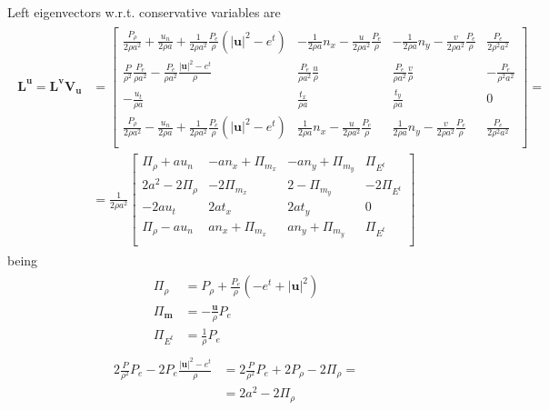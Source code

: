 \documentclass[letterpaper,10pt,english]{jupyterBook}
\begin{document}
\sphinxAtStartPar
Left eigenvectors w.r.t. conservative variables are
\begin{equation*}
\begin{split}\begin{aligned}
\mathbf{L}^\mathbf{u} = \mathbf{L}^{\mathbf{v}} \mathbf{V}_{\mathbf{u}} 
& = 
\begin{bmatrix}
  \frac{P_\rho}{2 \rho a^2} + \frac{u_n}{2 \rho a} + \frac{1}{2 \rho a^2} \frac{P_e}{\rho} (|\mathbf{u}|^2 - e^t) & 
  - \frac{1}{2 \rho a} n_x - \frac{u}{2 \rho a^2}\frac{P_e}{\rho} &
  - \frac{1}{2 \rho a} n_y - \frac{v}{2 \rho a^2}\frac{P_e}{\rho} &
  \frac{P_e}{2 \rho^2 a^2} \\
  \frac{P}{\rho^2}\frac{P_e}{\rho a^2} - \frac{P_e}{\rho a^2} \frac{|\mathbf{u}|^2 - e^t}{\rho} &
    \frac{P_e}{\rho a^2} \frac{u}{\rho} &
    \frac{P_e}{\rho a^2} \frac{v}{\rho} &
  - \frac{P_e}{\rho^2 a^2} \\
  - \frac{u_t}{\rho a} & \frac{t_x}{\rho a} & \frac{t_y}{\rho a} & 0 \\
  \frac{P_\rho}{2 \rho a^2} - \frac{u_n}{2 \rho a} + \frac{1}{2 \rho a^2} \frac{P_e}{\rho} (|\mathbf{u}|^2 - e^t) & 
    \frac{1}{2 \rho a} n_x - \frac{u}{2 \rho a^2}\frac{P_e}{\rho} &
    \frac{1}{2 \rho a} n_y - \frac{v}{2 \rho a^2}\frac{P_e}{\rho} &
  \frac{P_e}{2 \rho^2 a^2} \\
\end{bmatrix} = \\
& =
\frac{1}{2 \rho a^2}
\begin{bmatrix}
  \Pi_\rho + a u_n & - a n_x + \Pi_{m_x}  & - a n_y + \Pi_{m_y} & \Pi_{E^t} \\
   2 a^2 - 2 \Pi_{\rho} & - 2 \Pi_{m_x} & 2 - \Pi_{m_y} & - 2 \Pi_{E^t} \\
  - 2 a u_t & 2 a t_x & 2 a t_y & 0 \\
  \Pi_\rho - a u_n &   a n_x + \Pi_{m_x}  &   a n_y + \Pi_{m_y} & \Pi_{E^t} \\
\end{bmatrix}
\end{aligned}\end{split}
\end{equation*}
\sphinxAtStartPar
being
\begin{equation*}
\begin{split}\begin{aligned}
  \Pi_\rho & = P_\rho + \frac{ P_e }{\rho} \left( - e^t + |\mathbf{u}|^2 \right) \\
  \Pi_{\mathbf{m}} & = -\frac{\mathbf{u}}{\rho} P_e \\
  \Pi_{E^t} & = \frac{1}{\rho} P_e
\end{aligned}\end{split}
\end{equation*}\begin{equation*}
\begin{split}\begin{aligned}
2 \frac{P}{\rho^2} P_e - 2 P_e \frac{|\mathbf{u}|^2 - e^t}{\rho}
& = 2 \frac{P}{\rho^2} P_e + 2 P_\rho - 2 \Pi_\rho = \\
& = 2 a^2 - 2 \Pi_\rho
\end{aligned}\end{split}
\end{equation*}
\end{document}

